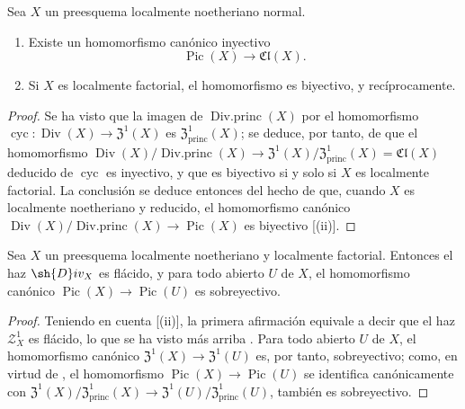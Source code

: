 \begin{corollary}[21.6.10]
\label{IV.21.6.10}
Sea $X$ un preesquema localmente noetheriano \textup{normal}.
\begin{enumerate}[label=\textup{(\roman*)}]
  \item Existe un homomorfismo canónico inyectivo
\[
\label{IV.21.6.10.1}
  \operatorname{Pic}(X)\to\mathfrak{Cl}(X).
  \tag{21.6.10.1}
\]

  \item Si $X$ es localmente factorial, el homomorfismo  es biyectivo, y recíprocamente.
\end{enumerate}
\end{corollary}

\begin{proof}
Se ha visto  que la imagen de $\operatorname{Div.princ}(X)$ por el homomorfismo $\operatorname{cyc}:\operatorname{Div}(X)\to\mathfrak{Z}^1(X)$ es $\mathfrak{Z}^1_\mathrm{princ}(X)$;
se deduce, por tanto, de  que el homomorfismo $\operatorname{Div}(X)/\operatorname{Div.princ}(X)\to\mathfrak{Z}^1(X)/\mathfrak{Z}^1_\mathrm{princ}(X)=\mathfrak{Cl}(X)$ deducido de $\operatorname{cyc}$ es inyectivo, y que es biyectivo si y solo si $X$ es localmente factorial.
La conclusión se deduce entonces del hecho de que, cuando $X$ es localmente noetheriano y reducido, el homomorfismo canónico $\operatorname{Div}(X)/\operatorname{Div.princ}(X)\to\operatorname{Pic}(X)$  es biyectivo [(ii)].
\end{proof}

\begin{corollary}[21.6.11]
\label{IV.21.6.11}
Sea $X$ un preesquema localmente noetheriano y localmente factorial.
Entonces el haz $\sh{D}iv_X$ es flácido, y para todo abierto $U$ de $X$, el homomorfismo canónico $\operatorname{Pic}(X)\to\operatorname{Pic}(U)$ es sobreyectivo.
\end{corollary}

\begin{proof}
Teniendo en cuenta [(ii)], la primera afirmación equivale a decir que el haz $\mathscr{Z}_X^1$ es flácido, lo que se ha visto más arriba .
Para todo abierto $U$ de $X$, el homomorfismo canónico $\mathfrak{Z}^1(X)\to\mathfrak{Z}^1(U)$ es, por tanto, sobreyectivo;
como, en virtud de , el homomorfismo $\operatorname{Pic}(X)\to\operatorname{Pic}(U)$ se identifica canónicamente con $\mathfrak{Z}^1(X)/\mathfrak{Z}^1_\mathrm{princ}(X)\to\mathfrak{Z}^1(U)/\mathfrak{Z}^1_\mathrm{princ}(U)$, también es sobreyectivo.
\end{proof}

